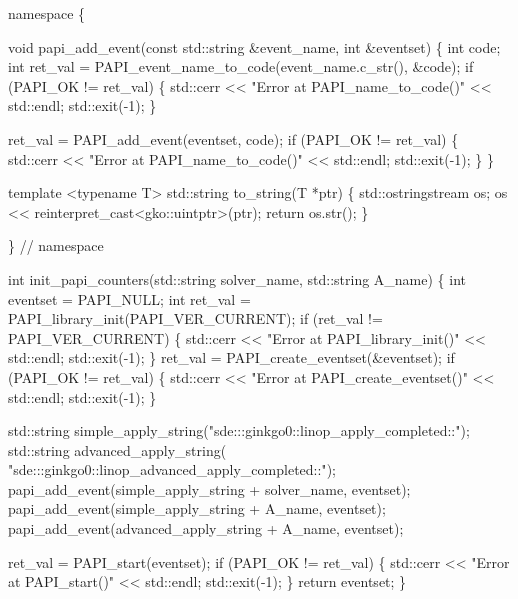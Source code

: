 \begin{DoxyCodeInclude}
\textcolor{keyword}{namespace }\{


\textcolor{keywordtype}{void} papi\_add\_event(\textcolor{keyword}{const} std::string &event\_name, \textcolor{keywordtype}{int} &eventset)
\{
    \textcolor{keywordtype}{int} code;
    \textcolor{keywordtype}{int} ret\_val = PAPI\_event\_name\_to\_code(event\_name.c\_str(), &code);
    \textcolor{keywordflow}{if} (PAPI\_OK != ret\_val) \{
        std::cerr << \textcolor{stringliteral}{"Error at PAPI\_name\_to\_code()"} << std::endl;
        std::exit(-1);
    \}

    ret\_val = PAPI\_add\_event(eventset, code);
    \textcolor{keywordflow}{if} (PAPI\_OK != ret\_val) \{
        std::cerr << \textcolor{stringliteral}{"Error at PAPI\_name\_to\_code()"} << std::endl;
        std::exit(-1);
    \}
\}


\textcolor{keyword}{template} <\textcolor{keyword}{typename} T>
std::string to\_string(T *ptr)
\{
    std::ostringstream os;
    os << reinterpret\_cast<gko::uintptr>(ptr);
    \textcolor{keywordflow}{return} os.str();
\}


\}  \textcolor{comment}{// namespace}


\textcolor{keywordtype}{int} init\_papi\_counters(std::string solver\_name, std::string A\_name)
\{
    \textcolor{keywordtype}{int} eventset = PAPI\_NULL;
    \textcolor{keywordtype}{int} ret\_val = PAPI\_library\_init(PAPI\_VER\_CURRENT);
    \textcolor{keywordflow}{if} (ret\_val != PAPI\_VER\_CURRENT) \{
        std::cerr << \textcolor{stringliteral}{"Error at PAPI\_library\_init()"} << std::endl;
        std::exit(-1);
    \}
    ret\_val = PAPI\_create\_eventset(&eventset);
    \textcolor{keywordflow}{if} (PAPI\_OK != ret\_val) \{
        std::cerr << \textcolor{stringliteral}{"Error at PAPI\_create\_eventset()"} << std::endl;
        std::exit(-1);
    \}

    std::string simple\_apply\_string(\textcolor{stringliteral}{"sde:::ginkgo0::linop\_apply\_completed::"});
    std::string advanced\_apply\_string(
        \textcolor{stringliteral}{"sde:::ginkgo0::linop\_advanced\_apply\_completed::"});
    papi\_add\_event(simple\_apply\_string + solver\_name, eventset);
    papi\_add\_event(simple\_apply\_string + A\_name, eventset);
    papi\_add\_event(advanced\_apply\_string + A\_name, eventset);

    ret\_val = PAPI\_start(eventset);
    \textcolor{keywordflow}{if} (PAPI\_OK != ret\_val) \{
        std::cerr << \textcolor{stringliteral}{"Error at PAPI\_start()"} << std::endl;
        std::exit(-1);
    \}
    \textcolor{keywordflow}{return} eventset;
\}



\end{DoxyCodeInclude}
